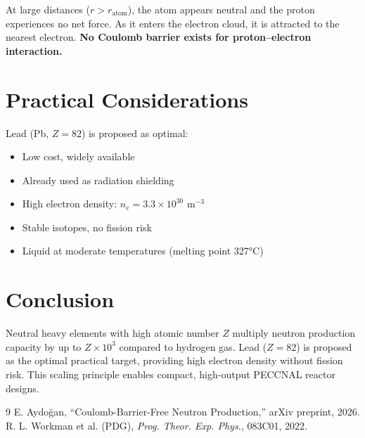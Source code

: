 \documentclass[12pt,a4paper]{article}
\begin{document}
At large distances ($r > r_\text{atom}$), the atom appears neutral
and the proton experiences no net force. As it enters the electron
cloud, it is attracted to the nearest electron.
\textbf{No Coulomb barrier exists for proton--electron interaction.}

\section{Practical Considerations}

Lead (Pb, $Z=82$) is proposed as optimal:
\begin{itemize}
\item Low cost, widely available
\item Already used as radiation shielding
\item High electron density: $n_e = 3.3 \times 10^{30}$ m$^{-3}$
\item Stable isotopes, no fission risk
\item Liquid at moderate temperatures (melting point 327°C)
\end{itemize}

\section{Conclusion}
Neutral heavy elements with high atomic number $Z$ multiply
neutron production capacity by up to $Z \times 10^3$ compared
to hydrogen gas. Lead ($Z=82$) is proposed as the optimal
practical target, providing high electron density without
fission risk. This scaling principle enables compact,
high-output PECCNAL reactor designs.

\begin{thebibliography}{9}
 E. Aydoğan, ``Coulomb-Barrier-Free Neutron Production,'' arXiv preprint, 2026.
 R. L. Workman et al. (PDG), \textit{Prog. Theor. Exp. Phys.}, 083C01, 2022.
\end{thebibliography}
\end{document}
